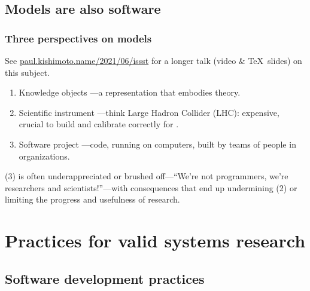 \documentclass[12pt,aspectratio=169]{beamer}
\begin{document}
\subsection{Models are also software}

\begin{frame}
\frametitle{Three perspectives on models}

See \href{https://paul.kishimoto.name/2021/06/issst}{paul.kishimoto.name/2021/06/issst} for a longer talk (video \& \TeX\ slides) on this subject.

\medskip
\begin{enumerate}
  \item Knowledge objects —a representation that embodies theory.
  \item Scientific instrument —think Large Hadron Collider (LHC): expensive, crucial to build and calibrate correctly for .
  \item Software project —code, running on computers, built by teams of people in organizations.
\end{enumerate}

\bigskip
(3) is often underappreciated or brushed off—“We're not programmers, we're researchers and scientists!”—with consequences that end up undermining (2) or limiting the progress and usefulness of research.
\end{frame}

\section{Practices for valid systems research}

\begin{frame}
\tableofcontentscurrent
\end{frame}

\subsection{Software development practices}
\end{document}
